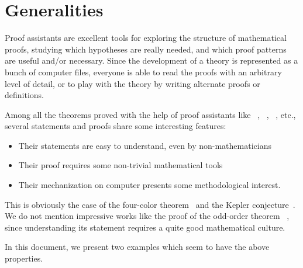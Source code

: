 \documentclass[twoside,a4paper]{book}
\begin{document}
  

\vspace{16pt}

\section{Generalities}

Proof assistants are excellent tools for exploring the structure of mathematical proofs,
studying  which hypotheses are really needed, and which proof patterns are useful and/or
necessary. Since the development of a theory is represented as a bunch of computer files,
everyone is able to read the proofs with an arbitrary level of detail, or to play with the theory by writing alternate proofs or definitions.


Among all the theorems proved with the help of proof assistants like \coq{}~\cite{Coq,BC04}, \hol{}~\cite{HOL}, \isabelle{}~\cite{isabelle},  etc.,
several statements and proofs  share some interesting features:
\begin{itemize}
\item Their statements are easy to understand, even by non-mathematicians
\item Their proof requires some non-trivial mathematical tools
\item Their mechanization on computer presents some methodological interest.
\end{itemize}






This is obviously the case of the four-color theorem~\cite{fourcolors}  and the Kepler conjecture~\cite{flyspeck2015}. We do not mention impressive works like the proof of the odd-order theorem ~\cite{oddorderthm}, since understanding its statement requires a quite good mathematical culture.


In this document, we present two examples which seem to have the above properties.
\end{document}
